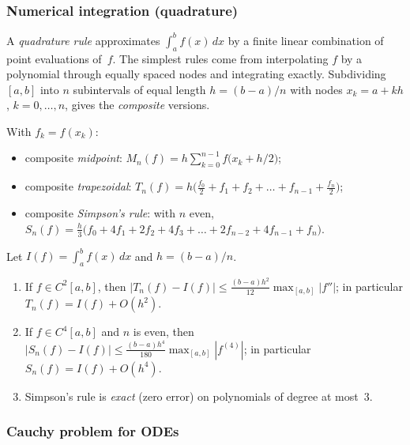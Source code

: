 \subsubsection*{Numerical integration (quadrature)}

A \emph{quadrature rule} approximates $\int_a^b f(x)\, dx$ by a
finite linear combination of point evaluations of~$f$. The simplest
rules come from interpolating $f$ by a polynomial through equally
spaced nodes and integrating exactly. Subdividing $[a, b]$ into $n$
subintervals of equal length $h = (b - a)/n$ with nodes
$x_k = a + kh$, $k = 0, \dots, n$, gives the \emph{composite}
versions.

\begin{definition}
\label{def:composite-quad}
With $f_k = f(x_k)$:
\begin{itemize}
  \item composite \emph{midpoint}: $M_n(f) = h \sum_{k=0}^{n-1} f\!\bigl(x_k + h/2\bigr)$;
  \item composite \emph{trapezoidal}: $T_n(f) = h \bigl(\tfrac{f_0}{2} + f_1 + f_2 + \dots + f_{n-1} + \tfrac{f_n}{2}\bigr)$;
  \item composite \emph{Simpson's rule}: with $n$ even,
        $S_n(f) = \tfrac{h}{3}\bigl(f_0 + 4 f_1 + 2 f_2 + 4 f_3 + \dots + 2 f_{n-2} + 4 f_{n-1} + f_n\bigr)$.
\end{itemize}
\end{definition}

\begin{theorem}
\label{thm:quadrature-error}
Let $I(f) = \int_a^b f(x)\, dx$ and $h = (b - a)/n$.
\begin{enumerate}[label=(\alph*)]
  \item If $f \in C^2[a, b]$, then
        $|T_n(f) - I(f)| \leq \tfrac{(b - a) h^2}{12} \max_{[a, b]} |f''|$;
        in particular $T_n(f) = I(f) + O(h^2)$.
  \item If $f \in C^4[a, b]$ and $n$ is even, then
        $|S_n(f) - I(f)| \leq \tfrac{(b - a) h^4}{180} \max_{[a, b]} |f^{(4)}|$;
        in particular $S_n(f) = I(f) + O(h^4)$.
  \item Simpson's rule is \emph{exact} (zero error) on polynomials of
        degree at most~$3$.
\end{enumerate}
\end{theorem}

\subsubsection*{Cauchy problem for ODEs}

